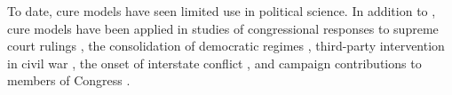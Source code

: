 \documentclass[letterpaper, 12pt]{article}
\theoremstyle{plain}
\begin{document}
To date, cure models have seen limited use in political science. In addition to \citep{svolik2008}, cure models have been applied in studies of congressional responses to supreme court rulings \citep{hettinger2005}, the consolidation of democratic regimes \citep{svolik2008}, third-party intervention in civil war \citep{findley2006}, the onset of interstate conflict \citep{clark2003}, and campaign contributions to members of Congress \citep{box2005}.

\end{document}

